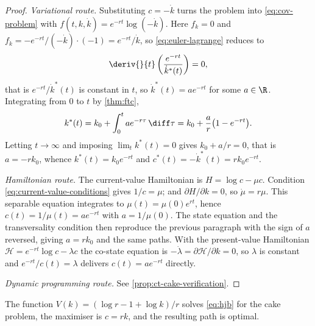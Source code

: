 \begin{proof}
	\emph{Variational route.} Substituting $c=-\dot k$ turns the problem into
	\eqref{eq:cov-problem} with $f(t,k,\dot k)=e^{-rt}\log(-\dot k)$. Here $f_k=0$
	and $f_{\dot k}=-e^{-rt}/(-\dot k)\cdot(-1)=e^{-rt}/\dot k$, so
	\eqref{eq:euler-lagrange} reduces to
	\[
		\deriv{}{t}\left(\frac{e^{-rt}}{\dot k^{\ast}(t)}\right)=0,
	\]
	that is $e^{-rt}/\dot k^{\ast}(t)$ is constant in $t$, so
	$\dot k^{\ast}(t)=ae^{-rt}$ for some $a\in\R$. Integrating from $0$ to $t$ by
	\autoref{thm:ftc},
	\[
		k^{\ast}(t)=k_0+\int_0^{t}ae^{-r\tau}\,\diff\tau
		=k_0+\frac{a}{r}\bigl(1-e^{-rt}\bigr).
	\]
	Letting $t\to\infty$ and imposing $\lim_tk^{\ast}(t)=0$ gives
	$k_0+a/r=0$, that is $a=-rk_0$, whence
	$k^{\ast}(t)=k_0e^{-rt}$ and $c^{\ast}(t)=-\dot k^{\ast}(t)=rk_0e^{-rt}$.

	\emph{Hamiltonian route.} The current-value Hamiltonian is
	$H=\log c-\mu c$. Condition \eqref{eq:current-value-conditions} gives
	$1/c=\mu$; and $\partial H/\partial k=0$, so $\dot\mu=r\mu$. This separable
	equation integrates to $\mu(t)=\mu(0)e^{rt}$, hence
	$c(t)=1/\mu(t)=ae^{-rt}$ with $a=1/\mu(0)$. The state equation and the
	transversality condition then reproduce the previous paragraph with the
	sign of $a$ reversed, giving $a=rk_0$ and the same paths. With the
	present-value Hamiltonian $\mathcal{H}=e^{-rt}\log c-\lambda c$ the co-state
	equation is $-\dot\lambda=\partial\mathcal{H}/\partial k=0$, so $\lambda$ is
	constant and $e^{-rt}/c(t)=\lambda$ delivers $c(t)=ae^{-rt}$ directly.

	\emph{Dynamic programming route.} See
	\autoref{prop:ct-cake-verification}.
\end{proof}

\begin{proposition}\label{prop:ct-cake-verification}
	The function $V(k)=(\log r-1+\log k)/r$ solves \eqref{eq:hjb} for the
	cake problem, the maximiser is $c=rk$, and the resulting path is optimal.
\end{proposition}

